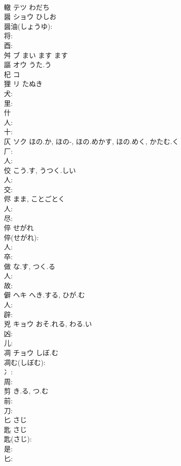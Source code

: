 \documentclass[8pt]{extreport}
\begin{document}
\begin{CJK}{UTF8}{min}
\\	轍	テツ わだち			
\\	醤	ショウ	ひしお		
\\	醤油(しょうゆ): 
\\	将: 
\\	酉: 
\\	舛	ブ まい ます ます			
\\	謳	オウ うた.う			
\\	杞	コ			
\\	狸	リ	たぬき		
\\	犬: 
\\	里: 
\\	什					
\\	人: 
\\	十: 
\\	仄	ソク	ほの.か, ほの-, ほの.めかす, ほの.めく, かたむ.く		
\\	厂: 
\\	人: 
\\	佼		こう.す, うつく.しい			
\\	人: 
\\	交: 
\\	侭		まま, ことごとく			
\\	人: 
\\	尽: 
\\	倅		せがれ			
\\	倅(せがれ): 
\\	人: 
\\	卒: 
\\	做		な.す, つく.る			
\\	人: 
\\	故: 
\\	僻	ヘキ	へき.する, ひが.む		
\\	人: 
\\	辟: 
\\	兇	キョウ	おそ.れる, わる.い		
\\	凶: 
\\	儿: 
\\	凋	チョウ	しぼ.む		
\\	凋む(しぼむ): 
\\	冫: 
\\	周: 
\\	剪		き.る, つ.む			
\\	前: 
\\	刀: 
\\	匕		さじ			
\\	匙		さじ			
\\	匙(さじ): 
\\	是: 
\\	匕: 

\end{CJK}
\end{document}
